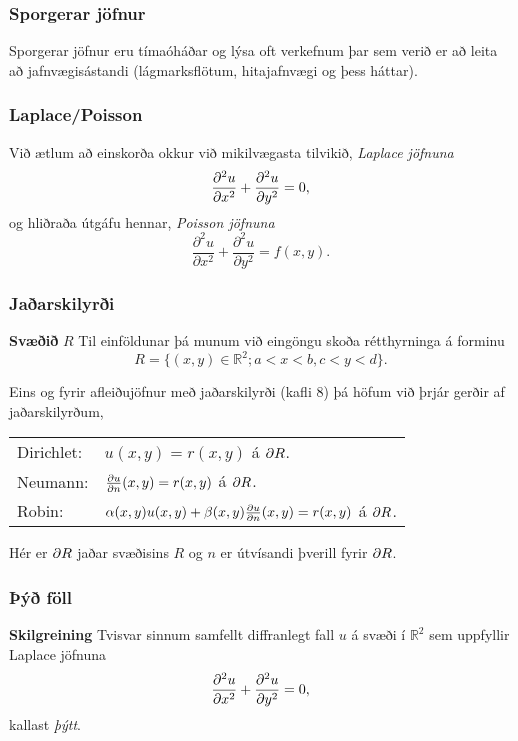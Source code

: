 \documentclass[icelandic,a4paper,12pt]{article}
\newcommand{\R}{{\mathbb  R}}
\begin{document}
\subsubsection{Sporgerar jöfnur}
 Sporgerar jöfnur eru tímaóháðar og lýsa oft verkefnum þar sem verið er að
 leita að jafnvægisástandi \pause (lágmarksflötum, hitajafnvægi og þess háttar).
 \pause
 
 \subsubsection{Laplace/Poisson}
 Við ætlum að einskorða okkur við mikilvægasta tilvikið, \emph{Laplace jöfnuna}
 $$
  \frac{{\partial}^2 u}{{\partial} x^2} + \frac{{\partial}^2 u}{{\partial} y^2} = 0,
 $$\pause
 og hliðraða útgáfu hennar, \emph{Poisson jöfnuna}
 $$
  \frac{\partial^2 u}{\partial x^2} + \frac{\partial^2 u}{\partial y^2} = f(x,y).
 $$
 


\subsubsection{Jaðarskilyrði}
\textbf{Svæðið} $R$
  Til einföldunar þá munum við eingöngu skoða rétthyrninga á forminu
  $$
    R = \{ (x,y) \in \R^2 ; a < x < b, c < y < d \}.
  $$
 
 Eins og fyrir afleiðujöfnur með jaðarskilyrði (kafli 8) þá höfum við þrjár gerðir
 af jaðarskilyrðum,
 \begin{center}
 \begin{tabular}{ll}
  Dirichlet: & $u(x,y) = r(x,y)$ á ${\partial} R$.\\
  Neumann:   & $\frac{{\partial} u}{{\partial} n}(x,y) = r(x,y)$ á ${\partial} R$.\\
  Robin:     & $\alpha(x,y)u(x,y) + 
  \beta(x,y)\frac{{\partial} u}{{\partial} n}(x,y) = r(x,y)$ á  ${\partial} R$.\\
 \end{tabular}
 \end{center}
Hér er ${\partial} R$ jaðar svæðisins $R$ og $n$ er útvísandi þverill fyrir ${\partial} R$.



\subsubsection{Þýð föll}
 \textbf{Skilgreining}
  Tvisvar sinnum samfellt diffranlegt fall $u$ á svæði í $\R^2$ sem uppfyllir
  Laplace jöfnuna
  $$ 
    \frac{{\partial}^2 u}{{\partial} x^2} + \frac{{\partial}^2 u}{{\partial} y^2} = 0,
  $$
  kallast \emph{þýtt}.
 
\end{document}
